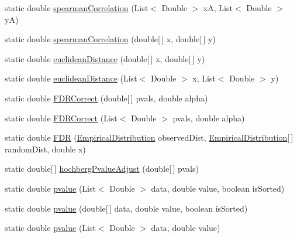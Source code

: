 \begin{DoxyCompactItemize}
\item 
static double \hyperlink{classbroad_1_1core_1_1math_1_1_statistics_ac1fc53b1f7c77248c1d143aa69b66119}{spearman\+Correlation} (List$<$ Double $>$ x\+A, List$<$ Double $>$ y\+A)
\item 
static double \hyperlink{classbroad_1_1core_1_1math_1_1_statistics_a76cb2e32ce0d360432af53e522082b21}{spearman\+Correlation} (double\mbox{[}$\,$\mbox{]} x, double\mbox{[}$\,$\mbox{]} y)
\item 
static double \hyperlink{classbroad_1_1core_1_1math_1_1_statistics_a9de4582f9f436737e0abe5df3103edd7}{euclidean\+Distance} (double\mbox{[}$\,$\mbox{]} x, double\mbox{[}$\,$\mbox{]} y)
\item 
static double \hyperlink{classbroad_1_1core_1_1math_1_1_statistics_ae504f744d5335ae55d65ebc1f01e6c69}{euclidean\+Distance} (List$<$ Double $>$ x, List$<$ Double $>$ y)
\item 
static double \hyperlink{classbroad_1_1core_1_1math_1_1_statistics_aa03bd4c674a7b114a4256fe104c4326f}{F\+D\+R\+Correct} (double\mbox{[}$\,$\mbox{]} pvals, double alpha)
\item 
static double \hyperlink{classbroad_1_1core_1_1math_1_1_statistics_a35660d0440c094eaaa06f3266116e34d}{F\+D\+R\+Correct} (List$<$ Double $>$ pvals, double alpha)
\item 
static double \hyperlink{classbroad_1_1core_1_1math_1_1_statistics_a61873382bc45d44b4a32b96f48ff7d0d}{F\+D\+R} (\hyperlink{classbroad_1_1core_1_1math_1_1_empirical_distribution}{Empirical\+Distribution} observed\+Dist, \hyperlink{classbroad_1_1core_1_1math_1_1_empirical_distribution}{Empirical\+Distribution}\mbox{[}$\,$\mbox{]} random\+Dist, double x)
\item 
static double\mbox{[}$\,$\mbox{]} \hyperlink{classbroad_1_1core_1_1math_1_1_statistics_a15fbf0333560a6fd827cb390e83228b1}{hochberg\+Pvalue\+Adjust} (double\mbox{[}$\,$\mbox{]} pvals)
\item 
static double \hyperlink{classbroad_1_1core_1_1math_1_1_statistics_a28ecf9004df344e775d5a745ce91bb60}{pvalue} (List$<$ Double $>$ data, double value, boolean is\+Sorted)
\item 
static double \hyperlink{classbroad_1_1core_1_1math_1_1_statistics_aa693f347ebe82d65497b026f93356740}{pvalue} (double\mbox{[}$\,$\mbox{]} data, double value, boolean is\+Sorted)
\item 
static double \hyperlink{classbroad_1_1core_1_1math_1_1_statistics_abccbc07449136d7db25216aaad2f499e}{pvalue} (List$<$ Double $>$ data, double value)
\item 

\end{DoxyCompactItemize}
